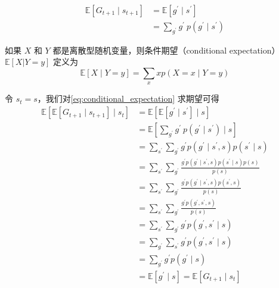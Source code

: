 \begin{equation}
  \begin{aligned}
    \mathbb{E}\left[G_{t+1} \mid s_{t+1}\right] &=\mathbb{E}\left[g^{\prime} \mid s^{\prime}\right] \\
    &=\sum_{g^{\prime}} g^{\prime}~p\left(g^{\prime} \mid s^{\prime}\right)
    \end{aligned}
  \label{eq:conditional_expectation}
\end{equation}

\begin{tcolorbox}[colframe=blue!25,colback=blue!10]
如果 $X$ 和 $Y$ 都是离散型随机变量，则条件期望（conditional expectation）$\mathbb{E}[X|Y=y]$ 定义为
\begin{equation}\nonumber
  \mathbb{E}[X \mid Y=y]=\sum_{x} x p(X=x \mid Y=y)
\end{equation}
\end{tcolorbox}

令 $s_t=s$，我们对\eqref{eq:conditional_expectation} 求期望可得
\begin{equation}
  \begin{aligned}
    \mathbb{E}\left[\mathbb{E}\left[G_{t+1} \mid s_{t+1}\right] \mid s_{t}\right] &=\mathbb{E} \left[\mathbb{E}\left[g^{\prime} \mid s^{\prime}\right] \mid s\right] \\
    &=\mathbb{E} \left[\sum_{g^{\prime}} g^{\prime}~p\left(g^{\prime} \mid s^{\prime}\right)\mid s\right]\\
    &=\sum_{s^{\prime}} \sum_{g^{\prime}} g^{\prime} p\left(g^{\prime} \mid s^{\prime}, s\right) p\left(s^{\prime} \mid s\right) \\
    &=\sum_{s^{\prime}} \sum_{g^{\prime}} \frac{g^{\prime} p\left(g^{\prime} \mid s^{\prime}, s\right) p\left(s^{\prime} \mid s\right) p(s)}{p(s)} \\
    &=\sum_{s^{\prime}} \sum_{g^{\prime}} \frac{g^{\prime} p\left(g^{\prime} \mid s^{\prime}, s\right) p\left(s^{\prime}, s\right)}{p(s)} \\
    &=\sum_{s^{\prime}} \sum_{g^{\prime}} \frac{g^{\prime} p\left(g^{\prime}, s^{\prime}, s\right)}{p(s)} \\
    &=\sum_{s^{\prime}} \sum_{g^{\prime}} g^{\prime} p\left(g^{\prime}, s^{\prime} \mid s\right) \\
    &=\sum_{g^{\prime}} \sum_{s^{\prime}} g^{\prime} p\left(g^{\prime}, s^{\prime} \mid s\right) \\
    &=\sum_{g^{\prime}} g^{\prime} p\left(g^{\prime} \mid s\right) \\
    &=\mathbb{E}\left[g^{\prime} \mid s\right]=\mathbb{E}\left[G_{t+1} \mid s_{t}\right]
    \end{aligned}    
\end{equation}

